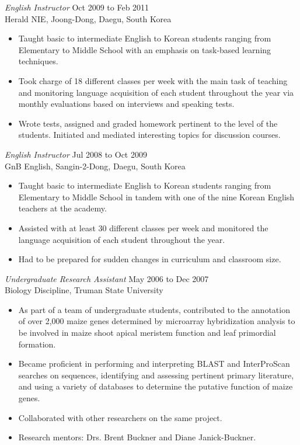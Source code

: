 \documentclass[margin, 10pt]{res} %
\begin{document}
\begin{resume}
{\sl English Instructor} \hfill Oct 2009 to Feb 2011 \\
Herald NIE, Joong-Dong, Daegu, South Korea
\begin{itemize} \itemsep -2pt %
\item Taught basic to intermediate English to Korean students ranging from Elementary to Middle School with an emphasis on task-based learning techniques.
\item Took charge of 18 different classes per week with the main task of teaching and monitoring language acquisition of each student throughout the year via monthly evaluations based on interviews and speaking tests.
\item Wrote tests, assigned and graded homework pertinent to the level of the students. Initiated and mediated interesting topics for discussion courses.
\end{itemize}

\newpage

{\sl English Instructor} \hfill Jul 2008 to Oct 2009 \\
GnB English, Sangin-2-Dong, Daegu, South Korea 
\begin{itemize} \itemsep -2pt %
\item Taught basic to intermediate English to Korean students ranging from Elementary to Middle School in tandem with one of the nine Korean English teachers at the academy.
\item Assisted with at least 30 different classes per week and monitored the language acquisition of each student throughout the year.
\item Had to be prepared for sudden changes in curriculum and classroom size.
\end{itemize} 
 
{\sl Undergraduate Research Assistant} \hfill May 2006 to Dec 2007 \\
Biology Discipline, Truman State University 
\begin{itemize} \itemsep -2pt %
\item As part of a team of undergraduate students, contributed to the annotation of over 2,000 maize genes determined by microarray hybridization analysis to be involved in maize shoot apical meristem function and leaf primordial formation.
\item Became proficient in performing and interpreting BLAST and InterProScan searches on sequences, identifying and assessing pertinent primary literature, and using a variety of databases to determine the putative function of maize genes.
\item Collaborated with other researchers on the same project.
\item Research mentors: Drs. Brent Buckner and Diane Janick-Buckner.
\end{itemize} 


\end{resume}
\end{document}
